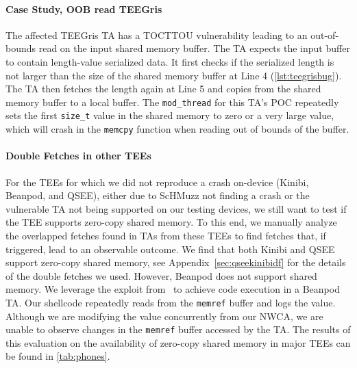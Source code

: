 \documentclass[letterpaper,twocolumn,10pt]{article}
\newcommand{\sysname}{ScHMuzz\xspace}
\newcommand{\teegris}{TEEGris\xspace}
\newcommand{\beanpod}{Beanpod\xspace}
\newcommand{\kinibi}{Kinibi\xspace}
\newcommand{\qsee}{QSEE\xspace}
\begin{document}
\paragraph{Case Study, OOB read \teegris}

\begin{listing}[h]
    
    \label{lst:teegrisbug}
\end{listing}

The affected \teegris TA has a TOCTTOU vulnerability leading to an out-of-bounds read on the 
input shared memory buffer. The TA expects the input buffer to contain length-value 
serialized data. It first checks if the 
serialized length is not larger than the size of the shared memory buffer at Line 4 (\autoref{lst:teegrisbug}).
The TA then fetches the length again at Line 5 and copies from the shared memory buffer to 
a local buffer. The \texttt{mod\_thread} for this TA's POC repeatedly sets the 
first \texttt{size\_t} value in the shared memory to zero or a very large value, 
which will crash in the \texttt{memcpy} function when reading out of bounds of the buffer.

\paragraph{Double Fetches in other TEEs}

For the TEEs for which we did not reproduce a crash on-device (\kinibi, \beanpod, and 
\qsee), either due to \sysname not finding a crash or the vulnerable TA not 
being supported on our testing devices, we still want to test if the TEE supports 
zero-copy shared memory. To this end, we manually analyze the overlapped fetches found 
in TAs from these TEEs to find fetches that, if triggered, lead to an observable 
outcome. We find that both \kinibi and \qsee support zero-copy shared memory, see Appendix~\ref{sec:qseekinibidf} 
for the details of the double fetches we used. However, \beanpod does not support 
shared memory. We leverage the exploit from~\cite{globalconfusion} to 
achieve code execution in a \beanpod TA. Our shellcode repeatedly reads from the 
\texttt{memref} buffer and logs the value. Although we are modifying the value concurrently
from our NWCA, we are unable to observe changes in the \texttt{memref} buffer accessed by the TA.
The results of this evaluation on the availability of zero-copy shared memory in major TEEs 
can be found in \autoref{tab:phones}.
\end{document}
